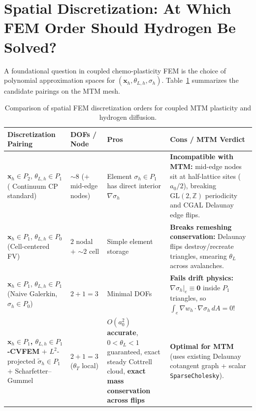 \documentclass[11pt,a4paper]{article}
\newcommand{\Z}{\mathbb{Z}}
\newcommand{\code}[1]{\texttt{#1}}
\begin{document}
\section{Spatial Discretization: At Which FEM Order Should Hydrogen Be Solved?}
\label{sec:spatial_order}

A foundational question in coupled chemo-plasticity FEM is the choice of polynomial approximation spaces for $(\mathbf{x}_h, \theta_{L,h}, \sigma_{h})$. Table~\ref{tab:fem_order} summarizes the candidate pairings on the MTM mesh.

\begin{table}[ht!]
\centering
\small
\renewcommand{\arraystretch}{1.22}
\begin{tabular}{@{}p{3.5cm}p{2.2cm}p{4.5cm}p{4.9cm}@{}}
\toprule
\textbf{Discretization Pairing} & \textbf{DOFs / Node} & \textbf{Pros} & \textbf{Cons / MTM Verdict} \\
\midrule
$\mathbf{x}_h \in P_2$, $\theta_{L,h} \in P_1$ \newline ( Continuum CP standard) & $\sim 8$ ($+$ mid-edge nodes) & Element $\sigma_h \in P_1$ has direct interior $\nabla\sigma_h$ & \textcolor{defectred}{\textbf{Incompatible with MTM:}} mid-edge nodes sit at half-lattice sites ($a_0/2$), breaking $\mathrm{GL}(2,\Z)$ periodicity and CGAL Delaunay edge flips. \\
\addlinespace[3pt]
$\mathbf{x}_h \in P_1$, $\theta_{L,h} \in P_0$ \newline (Cell-centered FV) & $2$ nodal $+$ $\sim 2$ cell & Simple element storage & \textcolor{defectred}{\textbf{Breaks remeshing conservation:}} Delaunay flips destroy/recreate triangles, smearing $\theta_L$ across avalanches. \\
\addlinespace[3pt]
$\mathbf{x}_h \in P_1$, $\theta_{L,h} \in P_1$ \newline (Naive Galerkin, $\sigma_h \in P_0$) & $2 + 1 = 3$ & Minimal DOFs & \textcolor{defectred}{\textbf{Fails drift physics:}} $\nabla \sigma_h|_e \equiv \mathbf{0}$ inside $P_1$ triangles, so $\int_e \nabla w_h \cdot \nabla\sigma_h\,dA = 0$! \\
\addlinespace[3pt]
\textbf{$\mathbf{x}_h \in P_1$, $\theta_{L,h} \in P_1$-CVFEM} \newline $+$ $L^2$-projected $\tilde{\sigma}_h \in P_1$ \newline $+$ Scharfetter--Gummel & \textbf{$2 + 1 = 3$} \newline ($\theta_T$ local) & \textbf{$O(a_0^2)$ accurate}, $0 < \theta_L < 1$ guaranteed, exact steady Cottrell cloud, \textbf{exact mass conservation across flips} & \textcolor{okgreen}{\textbf{Optimal for MTM}} (uses existing Delaunay cotangent graph + scalar \code{SparseCholesky}). \\
\bottomrule
\end{tabular}
\caption{Comparison of spatial FEM discretization orders for coupled MTM plasticity and hydrogen diffusion.}
\label{tab:fem_order}
\end{table}
\end{document}

